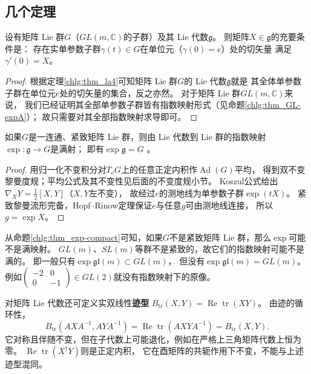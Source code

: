 \subsection{几个定理}

\begin{proposition}\label{chlg:thm_MatrixG-gexp}
    设有矩阵 Lie 群$G$（$GL(m,\mathbb{C})$的子群）及其 Lie 代数$\mathfrak{g}$。
    则矩阵$X\in \mathfrak{g}$的充要条件是：
    存在实单参数子群$\gamma(t)\in G$在单位元（$\gamma(0)=e$）处的切矢量
    满足$\gamma'(0)=X$。
\end{proposition}
\begin{proof}
根据定理\ref{chlg:thm_la4}可知矩阵 Lie 群$G$的 Lie 代数$\mathfrak{g}$就是
其全体单参数子群在单位元$e$处的切矢量的集合，反之亦然。
对于矩阵 Lie 群$GL(m,\mathbb{C})$来说，
我们已经证明其全部单参数子群皆有指数映射形式（见命题\ref{chlg:thm_GL-expA}）；
故只需要对其全部指数映射求导即可。
\end{proof}

\begin{proposition}\label{chlg:thm_exp-compact}
    如果$G$是一连通、紧致矩阵 Lie 群，则由 Lie 代数到 Lie 群的指数映射$\exp:\mathfrak{g}\to G$是满射；
    即有$\exp \mathfrak{g} = G$ 。
\end{proposition}
\begin{proof}
用归一化不变积分对$T_eG$上的任意正定内积作$\operatorname{Ad}(G)$平均，
得到双不变黎曼度规；平均公式及其不变性见后面的不变度规小节。
Koszul公式给出$\nabla_XY=\tfrac12[X,Y]$（$X,Y$左不变），
故经过$e$的测地线为单参数子群$\exp(tX)$。
紧致黎曼流形完备，Hopf--Rinow定理保证$e$与任意$g$可由测地线连接，
所以$g=\exp X$。
\end{proof}

从命题\ref{chlg:thm_exp-compact}可知，如果$G$不是紧致矩阵 Lie 群，那么$\exp$可能不是满映射。
$GL(m)$、$SL(m)$等群不是紧致的，故它们的指数映射可能不是满的。
即一般只有$\exp \mathfrak{gl}(m) \subset GL(m)$，
但没有$\exp \mathfrak{gl}(m) = GL(m)$。
例如$\left(\begin{smallmatrix} -2 & 0\\0 & -1\end{smallmatrix}\right) \in GL(2)$就没有指数映射下的原像。

对矩阵 Lie 代数还可定义实双线性\textbf{迹型}
$B_{\mathrm{tr}}(X,Y)=\operatorname{Re}\operatorname{tr}(XY)$。
由迹的循环性，
\[
 B_{\mathrm{tr}}(AXA^{-1},AYA^{-1})
 =\operatorname{Re}\operatorname{tr}(AXYA^{-1})=B_{\mathrm{tr}}(X,Y).
\]
它对称且伴随不变，但在子代数上可能退化，例如在严格上三角矩阵代数上恒为零。
$\operatorname{Re}\operatorname{tr}(X^\dagger Y)$则是正定内积，
它在酉矩阵的共轭作用下不变，不能与上述迹型混同。

